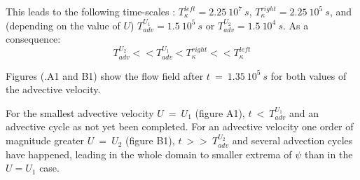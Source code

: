 This leads to the following time-scales : $T_{\kappa}^{left}=2.25 \ 10^7 \ s$, $T_{\kappa}^{right}=2.25 \ 10^5 \ s$, and (depending on the value of $U$) $T_{adv}^{U_1}=1.5 \ 10^5 \ s$ or $T_{adv}^{U_2}=1.5 \ 10^4 \ s$. As a consequence:
\begin{equation}
\displaystyle
T_{adv}^{U_2}<<T_{adv}^{U_1}<T_{\kappa}^{right}<<T_{\kappa}^{left}
\end{equation}

Figures (.A1 and B1) show the flow field after $t\ =\ 1.35\ 10^5 \ s$ for both values of the advective velocity. 

For the smallest advective velocity $U\ =\ U_1$ (figure A1), $t\ <\ T_{adv}^{U_1}$ and an advective cycle as not yet been completed.
For an advective velocity one order of magnitude greater $U\ =\ U_2$ (figure B1), $t\ >>\ T_{adv}^{U_2}$ and several advection cycles have happened, leading in the whole domain to smaller extrema of $\psi$ than in the $U=U_1$ case.


